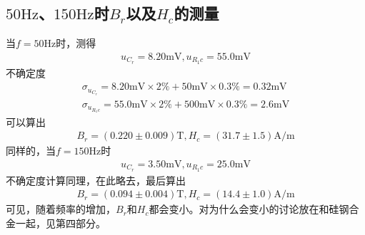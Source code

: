 \documentclass{ctexart}
\begin{document}
	\subsection{$50\mathrm{Hz}$、$150\mathrm{Hz}$时$B_r$以及$H_c$的测量}
	当$f=50\mathrm{Hz}$时，测得
	\begin{align}
		u_{C_r}=8.20\mathrm{mV},u_{R_1c}=55.0\mathrm{mV}
	\end{align}
	不确定度
	\begin{align}
		\sigma_{u_{C_r}}=8.20\mathrm{mV}\times 2\%+50\mathrm{mV}\times 0.3\%=0.32\mathrm{mV}\\
		\sigma_{u_{R_1c}}=55.0\mathrm{mV}\times 2\%+500\mathrm{mV}\times0.3\%=2.6\mathrm{mV}
	\end{align}
	可以算出
	\begin{align}
		B_r=(0.220\pm0.009)\mathrm{T},H_c=(31.7\pm 1.5)\mathrm{A/m}
	\end{align}
	同样的，当$f=150\mathrm{Hz}$时
	\begin{align}
		u_{C_r}=3.50\mathrm{mV},u_{R_1c}=25.0\mathrm{mV}
	\end{align}
	不确定度计算同理，在此略去，最后算出
	\begin{align}
		B_r=(0.094\pm0.004)\mathrm{T},H_c=(14.4\pm1.0)\mathrm{A/m}
	\end{align}
	可见，随着频率的增加，$B_r$和$H_c$都会变小。对为什么会变小的讨论放在和硅钢合金一起，见第四部分。
\end{document}
